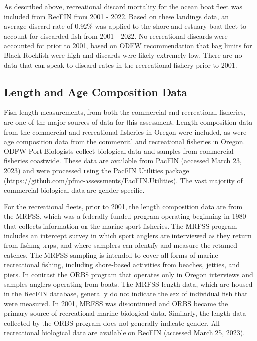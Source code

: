 \documentclass[11pt,
  letterpaper,
]{article}
\begin{document}
As described above, recreational discard mortality for the ocean boat fleet was included from RecFIN from 2001 - 2022. Based on these landings data, an average discard rate of 0.92\% was applied to the shore and estuary boat fleet to account for discarded fish from 2001 - 2022. No recreational discards were accounted for prior to 2001, based on ODFW recommendation that bag limits for Black Rockfish were high and discards were likely extremely low. There are no data that can speak to discard rates in the recreational fishery prior to 2001.

\hypertarget{length-and-age-composition-data}{%
\subsection{Length and Age Composition Data}\label{length-and-age-composition-data}}

Fish length measurements, from both the commercial and recreational fisheries, are one of the major sources of data for this assessment. Length composition data from the commercial and recreational fisheries in Oregon were included, as were age composition data from the commercial and recreational fisheries in Oregon. ODFW Port Biologists collect biological data and samples from commercial fisheries coastwide. These data are available from PacFIN (accessed March 23, 2023) and were processed using the PacFIN Utilities package (\url{https://github.com/pfmc-assessments/PacFIN.Utilities}). The vast majority of commercial biological data are gender-specific.

For the recreational fleets, prior to 2001, the length composition data are from the MRFSS, which was a federally funded program operating beginning in 1980 that collects information on the marine sport fisheries. The MRFSS program includes an intercept survey in which sport anglers are interviewed as they return from fishing trips, and where samplers can identify and measure the retained catches. The MRFSS sampling is intended to cover all forms of marine recreational fishing, including shore-based activities from beaches, jetties, and piers. In contrast the ORBS program that operates only in Oregon interviews and samples anglers operating from boats. The MRFSS length data, which are housed in the RecFIN database, generally do not indicate the sex of individual fish that were measured. In 2001, MRFSS was discontinued and ORBS became the primary source of recreational marine biological data. Similarly, the length data collected by the ORBS program does not generally indicate gender. All recreational biological data are available on RecFIN (accessed March 25, 2023).
\end{document}

